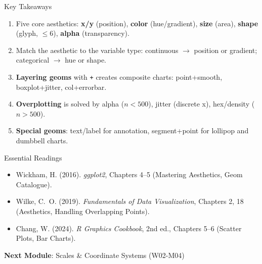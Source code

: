 \documentclass[10pt]{beamer}
\begin{document}
\begin{frame}{Key Takeaways}
  \begin{enumerate}
    \item Five core aesthetics: \textbf{x/y} (position), \textbf{color}
          (hue/gradient), \textbf{size} (area), \textbf{shape} (glyph,
          $\leq$6), \textbf{alpha} (transparency).
    \item Match the aesthetic to the variable type: continuous $\rightarrow$
          position or gradient; categorical $\rightarrow$ hue or shape.
    \item \textbf{Layering geoms} with \texttt{+} creates composite charts:
          point+smooth, boxplot+jitter, col+errorbar.
    \item \textbf{Overplotting} is solved by alpha ($n<500$), jitter
          (discrete x), hex/density ($n>500$).
    \item \textbf{Special geoms}: text/label for annotation,
          segment+point for lollipop and dumbbell charts.
  \end{enumerate}
\end{frame}

\begin{frame}{Essential Readings}
  \begin{itemize}
    \item Wickham, H. (2016). \emph{ggplot2}, Chapters 4--5
          (Mastering Aesthetics, Geom Catalogue).
    \item Wilke, C.~O. (2019). \emph{Fundamentals of Data Visualization},
          Chapters 2, 18 (Aesthetics, Handling Overlapping Points).
    \item Chang, W. (2024). \emph{R Graphics Cookbook}, 2nd ed., Chapters
          5--6 (Scatter Plots, Bar Charts).
  \end{itemize}
  \vspace{6pt}
  \textbf{Next Module}: Scales \& Coordinate Systems (W02-M04)
\end{frame}
\end{document}
